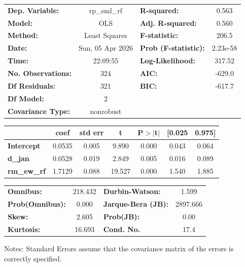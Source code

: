 \begin{center}
\begin{tabular}{lclc}
\toprule
\textbf{Dep. Variable:}    &   rp\_sml\_rf    & \textbf{  R-squared:         } &     0.563   \\
\textbf{Model:}            &       OLS        & \textbf{  Adj. R-squared:    } &     0.560   \\
\textbf{Method:}           &  Least Squares   & \textbf{  F-statistic:       } &     206.5   \\
\textbf{Date:}             & Sun, 05 Apr 2026 & \textbf{  Prob (F-statistic):} &  2.23e-58   \\
\textbf{Time:}             &     22:09:55     & \textbf{  Log-Likelihood:    } &    317.52   \\
\textbf{No. Observations:} &         324      & \textbf{  AIC:               } &    -629.0   \\
\textbf{Df Residuals:}     &         321      & \textbf{  BIC:               } &    -617.7   \\
\textbf{Df Model:}         &           2      & \textbf{                     } &             \\
\textbf{Covariance Type:}  &    nonrobust     & \textbf{                     } &             \\
\bottomrule
\end{tabular}
\begin{tabular}{lcccccc}
                    & \textbf{coef} & \textbf{std err} & \textbf{t} & \textbf{P$> |$t$|$} & \textbf{[0.025} & \textbf{0.975]}  \\
\midrule
\textbf{Intercept}  &       0.0535  &        0.005     &     9.890  &         0.000        &        0.043    &        0.064     \\
\textbf{d\_jan}     &       0.0528  &        0.019     &     2.849  &         0.005        &        0.016    &        0.089     \\
\textbf{rm\_ew\_rf} &       1.7129  &        0.088     &    19.527  &         0.000        &        1.540    &        1.885     \\
\bottomrule
\end{tabular}
\begin{tabular}{lclc}
\textbf{Omnibus:}       & 218.432 & \textbf{  Durbin-Watson:     } &    1.599  \\
\textbf{Prob(Omnibus):} &   0.000 & \textbf{  Jarque-Bera (JB):  } & 2897.666  \\
\textbf{Skew:}          &   2.605 & \textbf{  Prob(JB):          } &     0.00  \\
\textbf{Kurtosis:}      &  16.693 & \textbf{  Cond. No.          } &     17.4  \\
\bottomrule
\end{tabular}
\end{center}

Notes: \newline
 [1] Standard Errors assume that the covariance matrix of the errors is correctly specified.